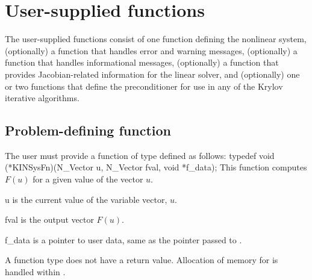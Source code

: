 \section{User-supplied functions}\label{ss:user_fct_sol}

The user-supplied functions consist of one function defining the nonlinear system,
(optionally) a function that handles error and warning messages,
(optionally) a function that handles informational messages, 
(optionally) a function that provides Jacobian-related information for the linear
solver, and (optionally) one or two functions that define the preconditioner for 
use in any of the Krylov iterative algorithms.

\subsection{Problem-defining function}\label{ss:sysFn}

The user must provide a function of type  defined as follows:
{
  typedef void (*KINSysFn)(N\_Vector u, N\_Vector fval, void *f\_data);
}
{
  This function computes $F(u)$ for a given value of the vector $u$.
}
{
  \begin{args}[f\_data]
  \item[u]
    is the current value of the variable vector, $u$.
  \item[fval]
    is the output vector $F(u)$.
  \item[f\_data]
    is a pointer to user data, same as the pointer       
    passed to .   
  \end{args}
}
{
  A  function type does not have a return value.
}
{
Allocation of memory for  is handled within {\kinsol}.
}

